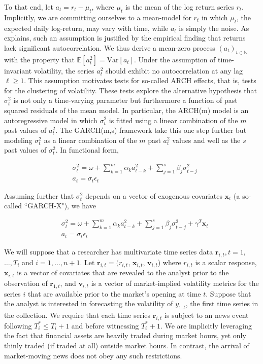 \documentclass[11pt]{article}
\newcommand{\ret}{\textbf{r}}
\newcommand{\x}{\textbf{x}}
\def\mrm#1{\mathrm{#1}} %
\def\E{\mathbb{E}} %
\theoremstyle{definition}
\begin{document}
To that end, let $a_{t} = r_{t} - \mu_{t}$, where $\mu_{t}$ is the mean of the log return series $r_{t}$.  Implicitly, we are committing ourselves to a mean-model for $r_{t}$ in which $\mu_{t}$, the expected daily log-return, may vary with time, while $a_{t}$ is simply the noise.  As \citet{cont2001empirical} explains, such an assumption is justified by the empirical finding that returns lack significant autocorrelation.  We thus derive a mean-zero process $(a_{t})_{t\in\mathbb{N}}$ with the property that $\E[a^{2}_{t}] = \mrm{Var}[a_{t}]$.  Under the assumption of time-invariant volatility, the series $a_{t}^{2}$ should exhibit no autocorrelation at any lag $\ell\geq1$.  This assumption motivates tests for so-called ARCH effects, that is, tests for the clustering of volatility.  These tests explore the alternative hypothesis that $\sigma_{t}^{2}$ is not only a time-varying parameter but furthermore a function of past squared residuals of the mean model.  In particular, the ARCH(m) model is an autoregressive model in which $\sigma_{t}^{2}$ is fitted using a linear combination of the $m$ past values of $a_{t}^{2}$.  The GARCH(m,s) framework take this one step further but modeling $\sigma_{t}^{2}$ as a linear combination of the $m$ past $a_{t}^{2}$ values and well as the $s$ past values of $\sigma_{t}^{2}$.  In functional form,

\begin{align*}
&\sigma_{t}^{2} = \omega + \sum^{m}_{k=1}\alpha_{k}a^{2}_{t-k} + \sum_{j=1}^{s}\beta_{j}\sigma_{t-j}^{2}\\
&a_{t} = \sigma_{t}\epsilon_{t}
\end{align*}

Assuming further that $\sigma^{2}_{t}$ depends on a vector of exogenous covariates $\x_{t}$ (a so-called ``GARCH-X"), we have

\begin{align*}
&\sigma_{t}^{2} = \omega+ \sum^{m}_{k=1}\alpha_{k}a^{2}_{t-k} + \sum_{j=1}^{s}\beta_{j}\sigma_{t-j}^{2} + \gamma^{T}\x_{t}\\
&a_{t} = \sigma_{t}\epsilon_{t}
\end{align*}

We will suppose that a researcher has multivariate time series data $\ret_{i,t}, t = 1,$ $\ldots,  T_i$ and $i = 1, \ldots, n+1$.  Let $\ret_{i,t} = (r_{i,t}$, $\x_{i,t}$, $\textbf{v}_{i,t}$) where $r_{i,t}$ is a scalar response,  $\x_{i,t}$ is a vector of covariates that are revealed to the analyst prior to the observation of $\ret_{1,t}$, and $\textbf{v}_{i,t}$ is a vector of market-implied volatility metrics for the series $i$ that are available prior to the market's opening at time $t$.  Suppose that the analyst is interested in forecasting the volatility of $y_{1,t}$, the first time series in the collection.  We require that each time series $\ret_{i,t}$ is subject to an news event following $T^*_i \leq T_{i} + 1$ and before witnessing $T^*_i+1$.  We are implicitly leveraging the fact that financial assets are heavily traded during market hours, yet only thinly traded (if traded at all) outside market hours.  In contrast, the arrival of market-moving news does not obey any such restrictions.
\end{document}
